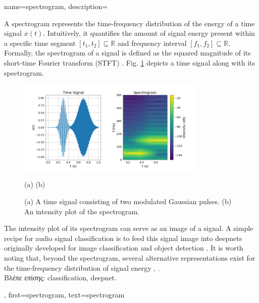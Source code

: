 \newcommand{\gaussiancenter}{3}

{name={spectrogram},
	description={A spectrogram represents the time-frequency distribution of the energy of a time signal $x(t)$.  
		Intuitively, it quantifies the amount of signal energy present within a specific time segment 
		$[t_{1},t_{2}] \subseteq \mathbb{R}$ and frequency interval $[f_{1},f_{2}]\subseteq \mathbb{R}$. 
		Formally, the spectrogram of a signal is defined as the squared magnitude of its 
		short-time Fourier transform (STFT) \cite{cohen1995time}.
        		Fig. \ref{fig:spectrogram_dict} depicts a time signal along with its spectrogram. 
		\begin{figure}[H]
			\centering
			\includegraphics[width=0.8\textwidth]{assets/spectrogram.png}
			\begin{minipage}{\textwidth}
				\vspace{3ex}
				\centering
				{\selectfont (a) \hspace{10em} (b)}
			\end{minipage}
			\caption{(a) A time signal consisting of two modulated Gaussian pulses. (b) An intensity 
			plot of the spectrogram.
			\label{fig:spectrogram_dict}}
		\end{figure}
        		The intensity plot of its spectrogram can serve as an image of a signal. A 
		simple recipe for audio signal \gls{classification} is to feed this signal image 
		into \gls{deepnet}s originally developed for image \gls{classification} and object detection \cite{Li:2022aa}. 
		It is worth noting that, beyond the spectrogram, several alternative representations exist 
		for the time-frequency distribution of signal energy \cite{TimeFrequencyAnalysisBoashash}, \cite{MallatBook}.\\
		\foreignlanguage{greek}{Βλέπε επίσης:} \gls{classification}, \gls{deepnet}.}, 
	first={spectrogram},
	text={spectrogram}
}

